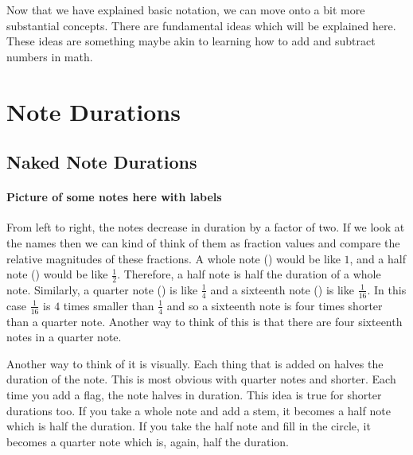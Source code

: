 \documentclass[../OpenAppliedMusicTheory.tex]{subfiles}
\begin{document}
    


    Now that we have explained basic notation, we can move onto a bit more substantial concepts. There are fundamental ideas which will be explained here. These ideas are something maybe akin to learning how to add and subtract numbers in math.

    \section{Note Durations}\label{ch2:duration}
        \subsection{Naked Note Durations}
        \paragraph{Picture of some notes here with labels}
        From left to right, the notes decrease in duration by a factor of two. If we look at the names then we can kind of think of them as fraction values and compare the relative magnitudes of these fractions. A whole note (\musWhole) would be like $1$, and a half note (\musHalf) would be like $\frac{1}{2}$. Therefore, a half note is half the duration of a whole note. Similarly, a quarter note (\musQuarter) is like $\frac{1}{4}$ and a sixteenth note (\musSixteenth) is like $\frac{1}{16}$. In this case $\frac{1}{16}$ is $4$ times smaller than $\frac{1}{4}$ and so a sixteenth note is four times shorter than a quarter note. Another way to think of this is that there are four sixteenth notes in a quarter note.

        Another way to think of it is visually. Each thing that is added on halves the duration of the note. This is most obvious with quarter notes and shorter. Each time you add a flag, the note halves in duration. This idea is true for shorter durations too. If you take a whole note and add a stem, it becomes a half note which is half the duration. If you take the half note and fill in the circle, it becomes a quarter note which is, again, half the duration.
\end{document}
